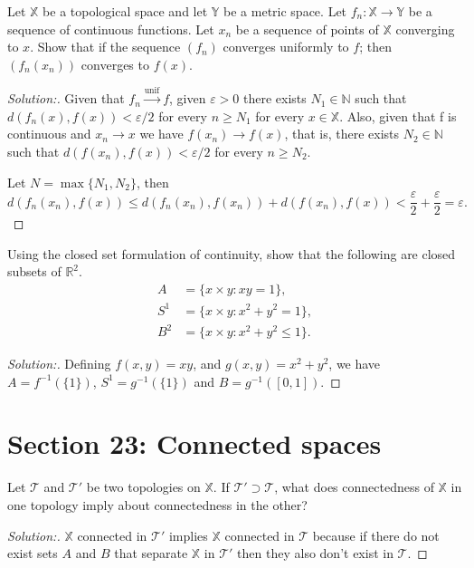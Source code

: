 \documentclass[a4paper,12pt, reqno]{article}
\theoremstyle{definition}
\newenvironment{exerr}[1]{
  \renewcommand\theexeralt{#1}
  \exeralt
}{\endexeralt}
\newenvironment{solution}{\begin{proof}[Solution:]}{\end{proof}}
\newcommand{\R}{\mathbb{R}}
\newcommand{\T}{\mathscr{T}}
\newcommand{\N}{\mathbb{N}}
\newcommand{\X}{\mathbb{X}}
\newcommand{\Y}{\mathbb{Y}}
\begin{document}
\begin{exerr}{8}
  Let $\X$ be a topological space and let $\Y$ be a metric space. Let $f_{n}: \X\to\Y$ be a sequence of continuous functions. Let $x_{n}$ be a sequence of points of $\X$ converging to $x$. Show that if the sequence $(f_{n})$ converges uniformly to $f$; then $(f_{n}(x_{n}))$ converges to $f(x)$.
\end{exerr}
\begin{solution}
  Given that $f_{n}\overset{\text{unif}}{\to}f$, given $\varepsilon>0$ there exists $N_{1}\in\N$ such that $d(f_{n}(x),f(x))<\varepsilon/2$ for every $n\geq N_{1}$ for every $x\in\X$. Also, given that f is continuous and $x_{n}\to x$ we have $f(x_{n})\to f(x)$, that is, there exists $N_{2}\in\N$ such that $d(f(x_{n}),f(x))<\varepsilon/2$ for every $n\geq N_{2}$.

  Let $N = \max\{ N_{1}, N_2  \}$, then
  \begin{equation*}
    d(f_{n}(x_{n}),f(x))\leq d(f_{n}(x_{n}),f(x_{n})) + d(f(x_{n}),f(x))<\frac{\varepsilon}{2} + \frac{\varepsilon}{2} =\varepsilon.
  \end{equation*}
\end{solution}

\begin{exerr}{10}
  Using the closed set formulation of continuity, show that the following are closed subsets of $\R^2$.
  \begin{align*}
    A   & = \{ x\times y : xy =1 \},         \\
    S^1 & =\{ x\times y : x^2 + y^2 =1 \},   \\
    B^2 & = \{ x\times y : x^2+y^2\leq 1 \}.
  \end{align*}
\end{exerr}
\begin{solution}
  Defining $f(x,y)= xy$, and $g(x,y) = x^2 + y^2$, we have $A = f^{-1}(\{ 1 \})$, $S^1 = g^{-1}(\{ 1 \})$ and $B = g^{-1}([0,1])$.
\end{solution}

\section*{Section 23: Connected spaces}

 \begin{exerr}{1}
  Let $\T$ and $\T'$ be two topologies on $\X$. If $\T'\supset\T$, what does connectedness of $\X$ in one topology imply about connectedness in the other?
 \end{exerr}
\begin{solution}
  $\X$ connected in $\T'$ implies $\X$ connected in $\T$ because if there do not exist sets $A$ and $B$ that separate $\X$ in $\T'$ then they also don't exist in $\T$.
\end{solution}
\end{document}
